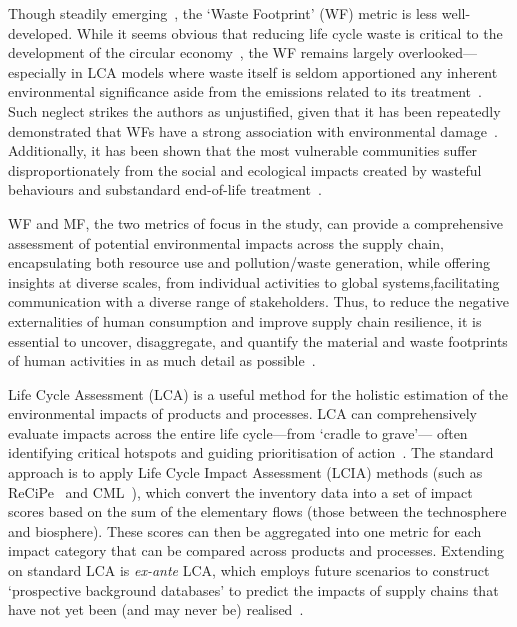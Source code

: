 \documentclass[a4paper,fleqn]{cas-dc}
\begin{document}
	Though steadily emerging~\citep{laurenti2016wastefootprint,demirer2019wastefootprint,guillotreau2023wastefootprint}, the `Waste Footprint' (WF) metric is less well-developed. While it seems obvious that reducing life cycle waste is critical to the development of the circular economy~\citep{towa2020wastefootprint,ellenmacarthur2015ce}, the WF remains largely overlooked---especially in LCA models where waste itself is seldom apportioned any inherent environmental significance aside from the emissions related to its treatment~\citep{laurenti2023wastefootprint}. Such neglect strikes the authors as unjustified, given that it has been repeatedly demonstrated that WFs have a strong association with environmental damage~\citep{laurenti2023wastefootprint,doka2024publications, ridoutt2010wasteimpacts,jaio2013wasteabsorbtionfootprint}. Additionally, it has been shown that the most vulnerable communities suffer disproportionately from the social and ecological impacts created by wasteful behaviours and substandard end-of-life treatment~\citep{pellow2023envjusticewaste,akese2018envjustice}.
	
	WF and MF, the two metrics of focus in the study, can provide a comprehensive assessment of potential environmental impacts across the supply chain, encapsulating both resource use and pollution/waste generation, while offering insights at diverse scales, from individual activities to global systems,facilitating communication with a diverse range of stakeholders. Thus, to reduce the negative externalities of human consumption and improve supply chain resilience, it is essential to uncover, disaggregate, and quantify the material and waste footprints of human activities in as much detail as possible~\citep{bisinella2024wastelca,towa2020wastefootprint,berger2020mineralsinlca,sonderegger2020mineralsinlca}.
	
	Life Cycle Assessment (LCA) is a useful method for the holistic estimation of the environmental impacts of products and processes. LCA can comprehensively evaluate impacts across the entire life cycle---from `cradle to grave'--- often identifying critical hotspots and guiding prioritisation of action~\citep{guinee2011lca}. The standard approach is to apply Life Cycle Impact Assessment (LCIA) methods (such as ReCiPe~\citep{huijbregts2016recipe} and CML~\citep{guinee2002cml}), which convert the inventory data into a set of impact scores based on the sum of the elementary flows (those between the technosphere and biosphere). These scores can then be aggregated into one metric for each impact category that can be compared across products and processes. Extending on standard LCA is \textit{ex-ante} LCA, which employs future scenarios to construct `prospective background databases' to predict the impacts of supply chains that have not yet been (and may never be) realised~\citep{cucurachi2018exante,blanco2020exante}.
	
\end{document}
